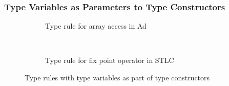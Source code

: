 \subsubsection{Type Variables as Parameters to Type Constructors}
\begin{figure}[]
    \begin{subfigure}{0.5\textwidth}
        \begin{prooftree}
        \end{prooftree}
    
        \caption{Type rule for array access in Ad}
        \label{fig:typeRuleArrAccess}
    \end{subfigure}
    ~
    \begin{subfigure}{0.4\textwidth}
        \begin{prooftree}
        \end{prooftree}

        \caption{Type rule for fix point operator in STLC}
        \label{fig:typeRuleFix}
    \end{subfigure}

    \caption{Type rules with type variables as part of type constructors}
    \label{fig:complicatedTypeRules}
\end{figure}

